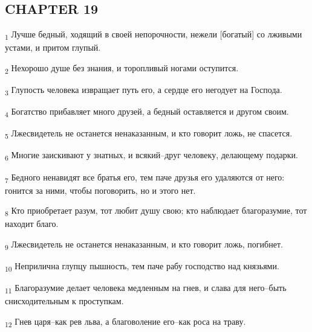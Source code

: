 \subsection{CHAPTER 19}
\begin{tcolorbox}
\textsubscript{1} Лучше бедный, ходящий в своей непорочности, нежели [богатый] со лживыми устами, и притом глупый.
\end{tcolorbox}
\begin{tcolorbox}
\textsubscript{2} Нехорошо душе без знания, и торопливый ногами оступится.
\end{tcolorbox}
\begin{tcolorbox}
\textsubscript{3} Глупость человека извращает путь его, а сердце его негодует на Господа.
\end{tcolorbox}
\begin{tcolorbox}
\textsubscript{4} Богатство прибавляет много друзей, а бедный оставляется и другом своим.
\end{tcolorbox}
\begin{tcolorbox}
\textsubscript{5} Лжесвидетель не останется ненаказанным, и кто говорит ложь, не спасется.
\end{tcolorbox}
\begin{tcolorbox}
\textsubscript{6} Многие заискивают у знатных, и всякий--друг человеку, делающему подарки.
\end{tcolorbox}
\begin{tcolorbox}
\textsubscript{7} Бедного ненавидят все братья его, тем паче друзья его удаляются от него: гонится за ними, чтобы поговорить, но и этого нет.
\end{tcolorbox}
\begin{tcolorbox}
\textsubscript{8} Кто приобретает разум, тот любит душу свою; кто наблюдает благоразумие, тот находит благо.
\end{tcolorbox}
\begin{tcolorbox}
\textsubscript{9} Лжесвидетель не останется ненаказанным, и кто говорит ложь, погибнет.
\end{tcolorbox}
\begin{tcolorbox}
\textsubscript{10} Неприлична глупцу пышность, тем паче рабу господство над князьями.
\end{tcolorbox}
\begin{tcolorbox}
\textsubscript{11} Благоразумие делает человека медленным на гнев, и слава для него--быть снисходительным к проступкам.
\end{tcolorbox}
\begin{tcolorbox}
\textsubscript{12} Гнев царя--как рев льва, а благоволение его--как роса на траву.
\end{tcolorbox}
